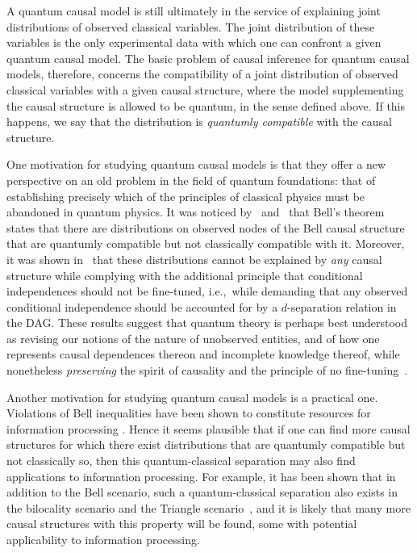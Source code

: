 \documentclass[aps,english,10pt,superscriptaddress,onecolumn,twoside,longbibliography,pra,floatfix,fleqn,nofootinbib]{revtex4-1}
\theoremstyle{definition}
\newcounter{example}[section]
\begin{document}
A quantum causal model is still ultimately in the service of explaining joint distributions of observed classical variables. The joint distribution of these variables is the only experimental data with which one can confront a given quantum causal model. The basic problem of causal inference for quantum causal models, therefore, concerns the compatibility of a joint distribution of observed classical variables with a given causal structure, where the model supplementing the causal structure is allowed to be quantum, in the sense defined above. If this happens, we say that the distribution is {\em quantumly compatible} with the causal structure.
 

One motivation for studying quantum causal models is that they offer a new perspective on an old  problem in the field of quantum foundations: that of establishing precisely which of the principles of classical physics must be abandoned in quantum physics. It was noticed by~\citet{fritz2012bell} and~\citet{WoodSpekkens} that Bell's theorem~\cite{bell1966lhvm} states that there are distributions on observed nodes of the Bell causal structure that are quantumly compatible but not classically compatible with it. Moreover, it was shown in~\cite{WoodSpekkens} that these distributions cannot be explained by \emph{any} causal structure while complying with the additional principle that conditional independences should not be fine-tuned, i.e.,~while demanding that any observed conditional independence should be accounted for by a $d$-separation relation in the DAG. These results suggest that quantum theory is perhaps best understood as revising our notions of the nature of unobserved entities, and of how one represents causal dependences thereon and incomplete knowledge thereof, while 
nonetheless {\em preserving} the spirit of causality and the principle of no fine-tuning~\cite{leifer2013conditionalstates,Spekkens2015paradigm,henson2011ontic}.

Another motivation for studying quantum causal models is a practical one.  Violations of Bell inequalities have  been shown to constitute resources for information processing \cite{NoSigPolytope,scarani2012device,BancalDIApproach}. Hence it seems plausible that if one can find more causal structures for which there exist distributions that are quantumly compatible but not classically so, then this quantum-classical separation may also find applications to information processing. 
For example, it has been shown that in addition to the Bell scenario, such a quantum-classical separation also exists 
in the bilocality scenario \cite{BilocalCorrelations} and the Triangle scenario~\cite{fritz2012bell}, and it is likely that many more causal structures with this property will be found, some with potential applicability to information processing.
\end{document}
